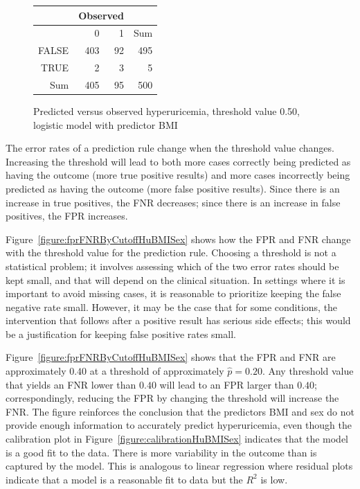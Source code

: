 \begin{figure}[ht]
\centering
\begin{tabular}{rrrr}
  \hline
  & \multicolumn{2}{c}{Observed} & \\
  \hline
 & 0 & 1 & Sum \\ 
  \hline
FALSE & 403 & 92 & 495 \\ 
  TRUE & 2 & 3 & 5 \\ 
  Sum & 405 & 95 & 500 \\ 
   \hline
\end{tabular}
\caption{Predicted versus observed hyperuricemia,
       threshold value 0.50, logistic model with predictor BMI} 
\label{figure:predVsObsHuBMI}
\end{figure}

The error rates of a prediction rule change when the threshold value changes. Increasing the threshold will lead to both more cases correctly being predicted as having the outcome (more true positive results) and more cases incorrectly being predicted as having the outcome (more false positive results). Since there is an increase in true positives, the FNR decreases; since there is an increase in false positives, the FPR increases.

Figure~\ref{figure:fprFNRByCutoffHuBMISex} shows how the FPR and FNR change with the threshold value for the prediction rule.  Choosing a threshold is not a statistical problem; it involves assessing which of the two error rates should be kept small, and that will depend on the clinical situation. In settings where it is important to avoid missing cases, it is reasonable to prioritize keeping the false negative rate small. However, it may be the case that for some conditions, the intervention that follows after a positive result has serious side effects; this would be a justification for keeping false positive rates small.

Figure~\ref{figure:fprFNRByCutoffHuBMISex} shows that the FPR and FNR are approximately $0.40$ at a threshold of approximately $\hat{p} = 0.20$.  Any threshold value that yields an FNR lower than $0.40$ will lead to an FPR larger than $0.40$;  correspondingly, reducing the FPR by changing the threshold will increase the FNR. The figure reinforces the conclusion that the predictors BMI and sex do not provide enough information to accurately predict hyperuricemia, even though the calibration plot in Figure~\ref{figure:calibrationHuBMISex} indicates that the model is a good fit to the data.  There is more variability in the outcome than is captured by the model.  This is analogous to linear regression where residual plots indicate that a model is a reasonable fit to data but the $R^2$ is low.

